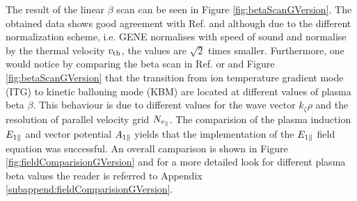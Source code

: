 
The result of the linear $\beta$ scan can be seen in Figure \ref{fig:betaScanGVersion}. The obtained data shows good agreement with Ref.  and  although due to the different normalization scheme, i.e. GENE normalises with speed of sound and {\gkw} normalise by the thermal velocity $v_\mathrm{th}$, the values are $\sqrt{2}$ times smaller. Furthermore, one would notice by comparing the beta scan in Ref.  or  and Figure \ref{fig:betaScanGVersion} that the transition from ion temperature gradient mode (ITG) to kinetic balloning mode (KBM) are located at different values of plasma beta $\beta$. This behaviour is due to different values for the wave vector $k_\zeta \rho$ and the resolution of parallel velocity grid $N_{v_\parallel}$. The comparision of the plasma induction $E_{1\parallel}$ and vector potential $A_{1\parallel}$ yields that the implementation of the $E_{1\parallel}$ field equation was successful. An overall camparison is shown in Figure \ref{fig:fieldComparisionGVersion} and for a more detailed look for different plasma beta values the reader is referred to Appendix \ref{subappend:fieldComparisionGVersion}.



\newpage